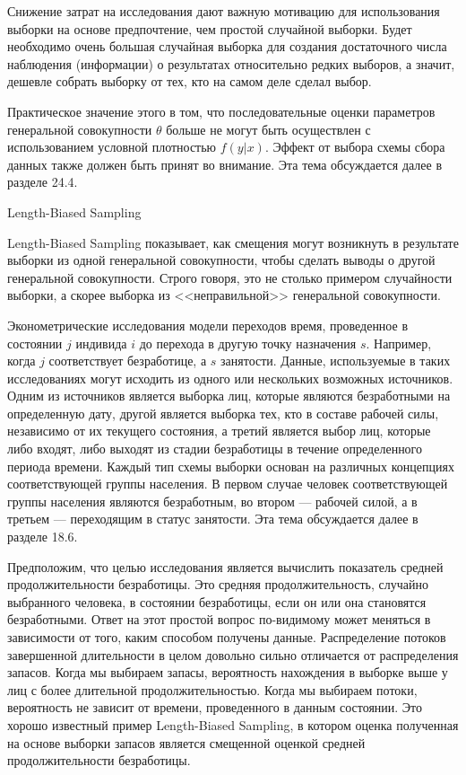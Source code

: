 Снижение затрат на исследования дают важную мотивацию для использования выборки на основе предпочтение, чем  простой случайной выборки. Будет необходимо очень большая случайная выборка для создания достаточного числа наблюдения (информации) о результатах относительно редких выборов, а значит, дешевле собрать выборку от тех, кто на самом деле сделал выбор.


Практическое значение этого в том, что последовательные оценки параметров генеральной совокупности $\theta$ больше не могут быть осуществлен с использованием условной плотностью $f(y|x)$. Эффект от выбора схемы сбора данных также должен быть принят во внимание. Эта тема обсуждается далее в разделе 24.4.


\begin{center}
Length-Biased Sampling
\end{center}

Length-Biased Sampling показывает, как смещения могут возникнуть в результате выборки из одной генеральной совокупности, чтобы сделать выводы о другой генеральной совокупности. Строго говоря, это не столько примером случайности выборки, а скорее выборка  из <<неправильной>> генеральной совокупности.


Эконометрические исследования модели переходов время, проведенное в состоянии $j$ индивида $i$ до перехода в другую точку назначения $s$. Например, когда $j$ соответствует безработице, а $s$ занятости. Данные, используемые в таких исследованиях могут исходить из одного или нескольких возможных источников. Одним из источников является выборка лиц, которые являются безработными на определенную дату, другой является выборка тех, кто в составе рабочей силы, независимо от их текущего состояния, а третий является выбор лиц, которые либо входят, либо выходят из стадии безработицы в течение определенного периода времени. Каждый тип схемы выборки основан на различных концепциях соответствующей группы населения. В первом случае человек соответствующей группы населения являются безработным, во втором --- рабочей силой, а в третьем --- переходящим в статус занятости. Эта тема обсуждается далее в разделе 18.6.


Предположим, что целью исследования является вычислить показатель средней продолжительности безработицы. Это средняя продолжительность, случайно выбранного человека, в состоянии безработицы, если он или она становятся безработными. Ответ на этот простой вопрос по-видимому может меняться в зависимости от того, каким способом получены данные. Распределение потоков завершенной длительности в целом довольно сильно отличается от распределения запасов. Когда мы выбираем запасы, вероятность нахождения в выборке выше у лиц с более длительной продолжительностью. Когда мы выбираем потоки, вероятность не зависит от времени, проведенного в данным состоянии. Это хорошо известный пример Length-Biased Sampling, в котором оценка полученная на основе выборки запасов является смещенной оценкой средней продолжительности безработицы.

